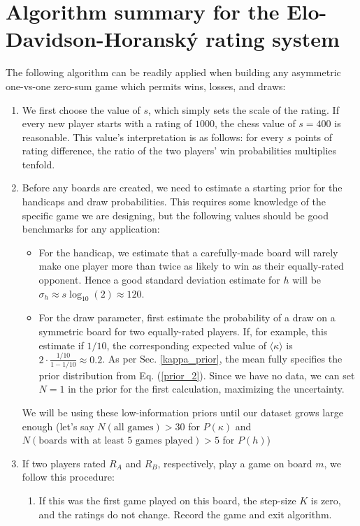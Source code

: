 \documentclass[12pt]{article}
\begin{document}
	\section{Algorithm summary for the Elo-Davidson-Horanský rating system}
	The following algorithm can be readily applied when building any asymmetric one-vs-one zero-sum game which permits wins, losses, and draws:
	\begin{enumerate}
	\item We first choose the value of $s$, which simply sets the scale of the rating. If every new player starts with a rating of $1000$, the chess value of $s=400$ is reasonable. This value's interpretation is as follows: for every $s$ points of rating difference, the ratio of the two players' win probabilities multiplies tenfold.
	\item Before any boards are created, we need to estimate a starting prior for the handicaps and draw probabilities. This requires some knowledge of the specific game we are designing, but the following values should be good benchmarks for any application:
	\begin{itemize}
	\item For the handicap, we estimate that a carefully-made board will rarely make one player more than twice as likely to win as their equally-rated opponent. Hence a good standard deviation estimate for $h$ will be $\sigma_h\approx s\log_{10}(2)\approx 120$.
	\item For the draw parameter, first estimate the probability of a draw on a symmetric board for two equally-rated players. If, for example, this estimate if $1/10$, the corresponding expected value of $\langle\kappa\rangle$ is $2\cdot\frac{1/10}{1-1/10}\approx 0.2$. As per Sec. \ref{kappa_prior}, the mean fully specifies the prior distribution from Eq. (\ref{prior_2}). Since we have no data, we can set $N=1$ in the prior for the first calculation, maximizing the uncertainty.
	\end{itemize}
	We will be using these low-information priors until our dataset grows large enough (let's say $N(\text{all games}) > 30$ for $P(\kappa)$ and $N(\text{boards with at least }5\text{ games played}) > 5$ for $P(h)$)
	\item If two players rated $R_A$ and $R_B$, respectively, play a game on board $m$, we follow this procedure:
	\begin{enumerate}
	\item If this was the first game played on this board, the step-size $K$ is zero, and the ratings do not change. Record the game and exit algorithm.

\end{enumerate}
\end{enumerate}
\end{document}
